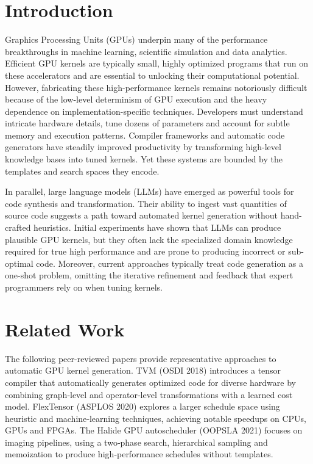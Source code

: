 \documentclass{article}
\begin{document}
\section{Introduction}
Graphics Processing Units (GPUs) underpin many of the performance breakthroughs in machine learning, scientific simulation and data analytics. Efficient GPU kernels are typically small, highly optimized programs that run on these accelerators and are essential to unlocking their computational potential. However, fabricating these high-performance kernels remains notoriously difficult because of the low-level determinism of GPU execution and the heavy dependence on implementation-specific techniques. Developers must understand intricate hardware details, tune dozens of parameters and account for subtle memory and execution patterns. Compiler frameworks and automatic code generators have steadily improved productivity by transforming high-level knowledge bases into tuned kernels. Yet these systems are bounded by the templates and search spaces they encode. 

In parallel, large language models (LLMs) have emerged as powerful tools for code synthesis and transformation. Their ability to ingest vast quantities of source code suggests a path toward automated kernel generation without hand-crafted heuristics. Initial experiments have shown that LLMs can produce plausible GPU kernels, but they often lack the specialized domain knowledge required for true high performance and are prone to producing incorrect or sub-optimal code. Moreover, current approaches typically treat code generation as a one-shot problem, omitting the iterative refinement and feedback that expert programmers rely on when tuning kernels. 


\section{Related Work}
The following peer-reviewed papers provide representative approaches to automatic GPU kernel generation. TVM (OSDI 2018) introduces a tensor compiler that automatically generates optimized code for diverse hardware by combining graph‑level and operator‑level transformations with a learned cost model. FlexTensor (ASPLOS 2020) explores a larger schedule space using heuristic and machine‑learning techniques, achieving notable speedups on CPUs, GPUs and FPGAs. The Halide GPU autoscheduler (OOPSLA 2021) focuses on imaging pipelines, using a two‑phase search, hierarchical sampling and memoization to produce high‑performance schedules without templates. 
\end{document}
